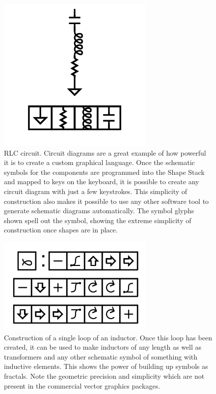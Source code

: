 \begin{figure}
	\centering
	\includegraphics[width=3in]{figures/shapes/rlc.png}
	\caption[RLC]
	{RLC circuit.  Circuit diagrams are a great example of how powerful it is to create a custom graphical language.  Once the schematic symbols for the components are programmed into the Shape Stack and mapped to keys on the keyboard, it is possible to create any circuit diagram with just a few keystrokes.  This simplicity of construction also makes it possible to use any other software tool to generate schematic diagrams automatically.  The symbol glyphs shown spell out the symbol, showing the extreme simplicity of construction once shapes are in place.}
\end{figure}

\begin{figure}
	\centering
	\includegraphics[width=3in]{figures/shapes/inductorloop.png}
	\caption[inductorloop]
	{Construction of a single loop of an inductor.  Once this loop has been created, it can be used to make inductors of any length as well as transformers and any other schematic symbol of something with inductive elements. This shows the power of building up symbols as fractals. Note the geometric precision and simplicity which are not present in the commercial vector graphics packages.}
\end{figure}

